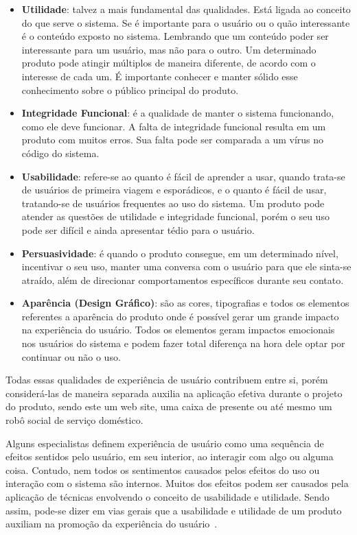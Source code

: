 \begin{itemize}
    \item \textbf{Utilidade}: talvez a mais fundamental das qualidades. Está ligada ao conceito do que serve o sistema. Se é importante para o usuário ou o quão interessante é o conteúdo exposto no sistema. Lembrando que um conteúdo poder ser interessante para um usuário, mas não para o outro. Um determinado produto pode atingir múltiplos de maneira diferente, de acordo com o interesse de cada um. É importante conhecer e manter sólido esse conhecimento sobre o público principal do produto.
    \item \textbf{Integridade Funcional}: é a qualidade de manter o sistema funcionando, como ele deve funcionar. A falta de integridade funcional resulta em um produto com muitos erros. Sua falta pode ser comparada a um vírus no código do sistema.
    \item \textbf{Usabilidade}: refere-se ao quanto é fácil de aprender a usar, quando trata-se de usuários de primeira viagem e esporádicos, e o quanto é fácil de usar, tratando-se de usuários frequentes ao uso do sistema. Um produto pode atender as questões de utilidade e integridade funcional, porém o seu uso pode ser difícil e ainda apresentar tédio para o usuário.
    \item \textbf{Persuasividade}: é quando o produto consegue, em um determinado nível, incentivar o seu uso, manter uma conversa com o usuário para que ele sinta-se atraído, além de direcionar comportamentos específicos durante seu contato.
    \item \textbf{Aparência (Design Gráfico)}: são as cores, tipografias e todos os elementos referentes a aparência do produto onde é possível gerar um grande impacto na experiência do usuário. Todos os elementos geram impactos emocionais nos usuários do sistema e podem fazer total diferença na hora dele optar por continuar ou não o uso.
\end{itemize}

Todas essas qualidades de experiência de usuário contribuem entre si, porém considerá-las de maneira separada auxilia na aplicação efetiva durante o projeto do produto, sendo este um web site, uma caixa de presente ou até mesmo um robô social de serviço doméstico.

Alguns especialistas definem experiência de usuário como uma sequência de efeitos sentidos pelo usuário, em seu interior, ao interagir com algo ou alguma coisa. Contudo, nem todos os sentimentos causados pelos efeitos do uso ou interação com o sistema são internos. Muitos dos efeitos podem ser causados pela aplicação de técnicas envolvendo o conceito de usabilidade e utilidade. Sendo assim, pode-se dizer em vias gerais que a usabilidade e utilidade de um produto auxiliam na promoção da experiência do usuário~\cite{hartson:2012}.

